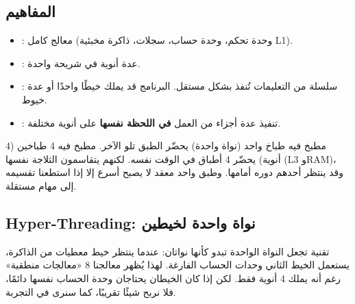 \subsection{المفاهيم}
\begin{tarif}
    \begin{itemize}
        \item {}: معالج كامل (وحدة تحكم، وحدة حساب، سجلات، ذاكرة مخبئية \textenglish{L1}).
        \item {}: عدة أنوية في شريحة واحدة.
        \item {}: سلسلة من التعليمات تُنفذ بشكل مستقل. البرنامج قد يملك خيطًا واحدًا أو عدة خيوط.
        \item {}: تنفيذ عدة أجزاء من العمل
              \textbf{في اللحظة نفسها} على أنوية مختلفة.
    \end{itemize}
\end{tarif}

\begin{center}
\end{center}

\begin{tashbih}
    مطبخ فيه طباخ واحد (نواة واحدة) يحضّر الطبق تلو الآخر. مطبخ فيه 4 طباخين (4 أنوية) يحضّر 4 أطباق
    في الوقت نفسه. لكنهم يتقاسمون الثلاجة نفسها (\textenglish{L3} و\textenglish{RAM})، وقد ينتظر أحدهم دوره
    أمامها. وطبق واحد معقد لا يصبح أسرع إلا إذا استطعنا تقسيمه إلى مهام مستقلة.
\end{tashbih}

\subsection{\textenglish{Hyper-Threading}: نواة واحدة لخيطين}
تقنية  تجعل النواة الواحدة تبدو
كأنها نواتان: عندما ينتظر خيط معطيات من الذاكرة، يستعمل الخيط الثاني وحدات الحساب الفارغة. لهذا يُظهر
معالجنا 8 «معالجات منطقية» رغم أنه يملك 4 أنوية فقط. لكن إذا كان الخيطان يحتاجان وحدة الحساب نفسها
دائمًا، فلا نربح شيئًا تقريبًا، كما سنرى في التجربة.


